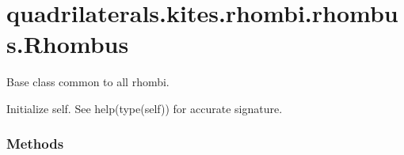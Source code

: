 \documentclass[letterpaper,10pt,english]{sphinxmanual}
\begin{document}
\section{quadrilaterals.kites.rhombi.rhombus.Rhombus}
\label{\detokenize{_autosummary/quadrilaterals.kites.rhombi.rhombus.Rhombus:quadrilaterals-kites-rhombi-rhombus-rhombus}}\label{\detokenize{_autosummary/quadrilaterals.kites.rhombi.rhombus.Rhombus::doc}}

\begin{fulllineitems}
\label{\detokenize{_autosummary/quadrilaterals.kites.rhombi.rhombus.Rhombus:quadrilaterals.kites.rhombi.rhombus.Rhombus}}
Base class common to all rhombi.

\begin{sphinxVerbatim}[commandchars=\\\{\}]
   
\end{sphinxVerbatim}

\begin{fulllineitems}
\label{\detokenize{_autosummary/quadrilaterals.kites.rhombi.rhombus.Rhombus:quadrilaterals.kites.rhombi.rhombus.Rhombus.__init__}}
Initialize self.  See help(type(self)) for accurate signature.

\end{fulllineitems}

\subsubsection*{Methods}


\begin{savenotes}\sphinxatlongtablestart\begin{longtable}[c]{}
\hline


\end{longtable}
\end{savenotes}
\end{fulllineitems}
\end{document}
